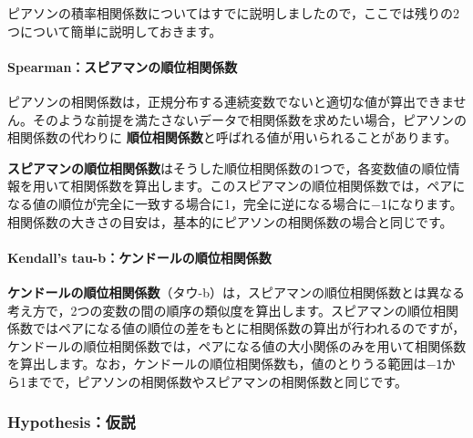 \documentclass[
  12pt,
  a5jpaper,
  lualatex, ja=standard]{bxjsbook}
\renewcommand{\emph}[1]{\textbf{\color{emph} #1}}
\begin{document}
ピアソンの積率相関係数についてはすでに説明しましたので，ここでは残りの2つについて簡単に説明しておきます。

\hypertarget{spearmanux30b9ux30d4ux30a2ux30deux30f3ux306eux9806ux4f4dux76f8ux95a2ux4fc2ux6570}{%
\paragraph*{Spearman：スピアマンの順位相関係数}\label{spearmanux30b9ux30d4ux30a2ux30deux30f3ux306eux9806ux4f4dux76f8ux95a2ux4fc2ux6570}}

ピアソンの相関係数は，正規分布する連続変数でないと適切な値が算出できません。そのような前提を満たさないデータで相関係数を求めたい場合，ピアソンの相関係数の代わりに\emph{順位相関係数}と呼ばれる値が用いられることがあります。

\emph{スピアマンの順位相関係数}はそうした順位相関係数の1つで，各変数値の順位情報を用いて相関係数を算出します。このスピアマンの順位相関係数では，ペアになる値の順位が完全に一致する場合に1，完全に逆になる場合に\(-\textsf{1}\)になります。相関係数の大きさの目安は，基本的にピアソンの相関係数の場合と同じです。

\hypertarget{kendalls-tau-bux30b1ux30f3ux30c9ux30fcux30ebux306eux9806ux4f4dux76f8ux95a2ux4fc2ux6570}{%
\paragraph*{Kendall's tau-b：ケンドールの順位相関係数}\label{kendalls-tau-bux30b1ux30f3ux30c9ux30fcux30ebux306eux9806ux4f4dux76f8ux95a2ux4fc2ux6570}}

\emph{ケンドールの順位相関係数}（タウ-b）は，スピアマンの順位相関係数とは異なる考え方で，2つの変数の間の順序の類似度を算出します。スピアマンの順位相関係数ではペアになる値の順位の差をもとに相関係数の算出が行われるのですが，ケンドールの順位相関係数では，ペアになる値の大小関係のみを用いて相関係数を算出します。なお，ケンドールの順位相関係数も，値のとりうる範囲は\(-\textsf{1}\)から1までで，ピアソンの相関係数やスピアマンの相関係数と同じです。

\hypertarget{hypothesisux4eeeux8aac}{%
\subsubsection*{Hypothesis：仮説}\label{hypothesisux4eeeux8aac}}
\end{document}
